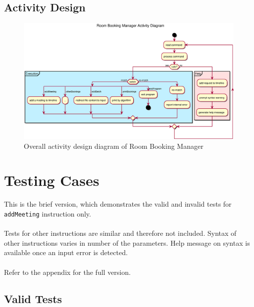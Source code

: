\documentclass{article}
\begin{document}
        \subsection{Activity Design}
            \begin{figure}[!htbp]
                \centering
                \includegraphics[scale=0.45]{eps/activity_diagram.eps}
                \caption{Overall activity design diagram of Room Booking Manager}
            \end{figure}
    \cleardoublepage
    \section{Testing Cases}
        \paragraph{}
        This is the brief version, which demonstrates the valid and invalid tests for \texttt{addMeeting} instruction only.
        \paragraph{}
        Tests for other instructions are similar and therefore not included. Syntax of other instructions varies in
        number of the parameters. Help message on syntax is available once an input error is detected.
        \paragraph{}
        Refer to the appendix for the full version. 

        \subsection{Valid Tests}
\end{document}
